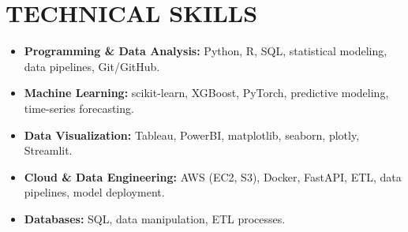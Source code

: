 \documentclass[a4paper,9pt]{extarticle}
\begin{document}
\section*{TECHNICAL SKILLS}

\begin{itemize}[leftmargin=0.5cm, label={}]
\item \textbf{Programming \& Data Analysis:} Python, R, SQL, statistical modeling, data pipelines, Git/GitHub. \\

\item \textbf{Machine Learning:} scikit-learn, XGBoost, PyTorch, predictive modeling, time-series forecasting. \\

\item \textbf{Data Visualization:} Tableau, PowerBI, matplotlib, seaborn, plotly, Streamlit. \\

\item \textbf{Cloud \& Data Engineering:} AWS (EC2, S3), Docker, FastAPI, ETL, data pipelines, model deployment. \\

\item \textbf{Databases:} SQL, data manipulation, ETL processes. \\
\end{itemize}
\end{document}
